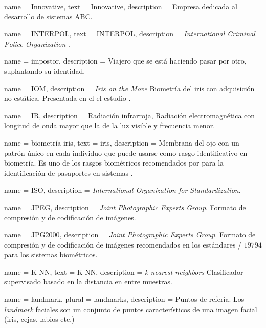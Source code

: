 {
    name        = {Innovative},
    text        = \mbox{Innovative},
    description = {Empresa dedicada al desarrollo de sistemas ABC.}
}

{
    name        = {INTERPOL},
    text        = \mbox{INTERPOL},
    description = {\textit{International Criminal Police Organization} \cite{INTERPOLOnline}.}
}

{
    name        = {impostor},
    description = {Viajero que se está haciendo pasar por otro, suplantando su identidad.}
}

{
    name        = {IOM},
    description = {\textit{Iris on the Move} Biometría del \gls{iris} con adquisición no estática. Presentada en el el estudio \cite{matey2006iris}.}
}

{
    name        = {IR},
    description = {Radiación infrarroja, Radiación electromagnética con longitud de onda mayor que la de la luz visible y frecuencia menor.}
}

{
    name        = {biometría iris},
    text        = {iris},
    description = {Membrana del ojo con un patrón único en cada individuo que puede usarse como rasgo identificativo en biometría. Es uno de los rasgos biométricos recomendados por  para la identificación de pasaportes en sistemas  \cite{doc20069303}.}
}

{
    name        = {ISO},
    description = {\textit{International Organization for Standardization}.}
}

{
    name        = {JPEG},
    description = {\textit{Joint Photographic Experts Group}. Formato de compresión y de codificación de imágenes.}
}

{
    name        = {JPG2000},
    description = {\textit{Joint Photographic Experts Group}. Formato de compresión y de codificación de imágenes recomendados en los estándares / $19794$ \cite{ISO/Format} para los sistemas biométricos.}
}

{
    name        = {K-NN},
    text        = {\mbox{K-NN}},
    description = {\textit{k-nearest neighbors} Clasificador supervisado basado en la distancia en entre muestras.}
}

{
    name        = {landmark},
    plural      = {landmarks},
    description = {Puntos de refería. Los \textit{landmark} faciales son un conjunto de puntos característicos de una imagen facial (iris, cejas, labios etc.)}
}
 
